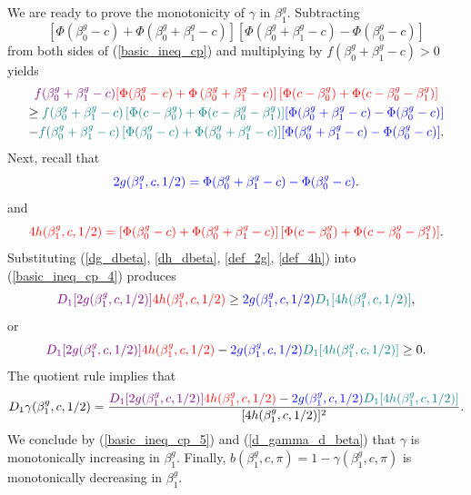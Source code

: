\documentclass[11pt]{article}
\begin{document}
\begin{appendices}
\begin{refsection}
We are ready to prove the monotonicity of $\gamma$ in $\beta^g_1$. Subtracting $$\left[\Phi(\beta_0^g - c) + \Phi(\beta^g_0 + \beta^g_1 - c) \right]\left[\Phi(\beta_0^g + \beta_1^g - c) - \Phi(\beta_0^g - c)\right]$$ from both sides of (\ref{basic_ineq_cp}) and multiplying by $f(\beta^g_0 + \beta^g_1 - c) > 0$ yields
\begin{multline}\label{basic_ineq_cp_4}
\textcolor{violet}{f(\beta^g_0 + \beta^g_1 - c)} \textcolor{red}{ \left[\Phi(\beta^g_0 - c) + \Phi\left(\beta^g_0 + \beta^g_1 - c \right) \right] \left[ \Phi(c - \beta^g_0) + \Phi(c - \beta^g_0 - \beta^g_1) \right]}  \\ \geq \textcolor{teal}{f(\beta^g_0 + \beta^g_1 - c) \left[\Phi(c - \beta^g_0) + \Phi(c - \beta_0^g - \beta_1^g)\right]}\textcolor{blue}{\left[\Phi(\beta_0^g + \beta_1^g - c) - \Phi(\beta_0^g - c)\right]} \\ -\textcolor{teal}{f(\beta^g_0 + \beta^g_1 - c)   \left[\Phi(\beta_0^g - c) + \Phi(\beta^g_0 + \beta^g_1 - c) \right]} \textcolor{blue}{\left[\Phi(\beta_0^g + \beta_1^g - c) - \Phi(\beta_0^g - c)\right]}.
\end{multline}
Next, recall that
\begin{equation}\label{def_2g}
\textcolor{blue}{2g(\beta^g_1,c,1/2) = \Phi(\beta^g_0 + \beta^g_1 - c) - \Phi(\beta^g_0 - c)}.
\end{equation}
and
\begin{equation}\label{def_4h}
\textcolor{red}{4h(\beta^g_1, c, 1/2) = \left[ \Phi(\beta^g_0 - c) + \Phi(\beta^g_0 + \beta^g_1 - c) \right] \left[\Phi(c - \beta^g_0) + \Phi( c - \beta^g_0 - \beta^g_1) \right]}.
\end{equation}
Substituting (\ref{dg_dbeta}, \ref{dh_dbeta}, \ref{def_2g}, \ref{def_4h}) into (\ref{basic_ineq_cp_4}) produces
\begin{equation*}
\textcolor{violet}{D_1[2g(\beta^g_1, c, 1/2)]}\textcolor{red}{4h(\beta^g_1, c, 1/2)} \geq \textcolor{blue}{2g(\beta^g_1, c, 1/2)}\textcolor{teal}{D_1[4h(\beta^g_1, c, 1/2)]},
\end{equation*}
or 
\begin{equation}\label{basic_ineq_cp_5}
\textcolor{violet}{D_1[2g(\beta^g_1, c, 1/2)]}\textcolor{red}{4h(\beta^g_1, c, 1/2)} - \textcolor{blue}{2g(\beta^g_1, c, 1/2)}\textcolor{teal}{D_1[4h(\beta^g_1, c, 1/2)]} \geq 0.
\end{equation}
The quotient rule implies that
\begin{equation}\label{d_gamma_d_beta}
D_1 \gamma(\beta^g_1, c, 1/2) = \frac{ \textcolor{violet}{D_1[2g(\beta^g_1, c, 1/2)]}\textcolor{red}{4h(\beta^g_1, c, 1/2)} - \textcolor{blue}{2g(\beta^g_1, c, 1/2)}\textcolor{teal}{D_1[4h(\beta^g_1, c, 1/2)]} }{[4h(\beta^g_1, c, 1/2)]^2}.
\end{equation}
We conclude by (\ref{basic_ineq_cp_5}) and (\ref{d_gamma_d_beta}) that $\gamma$ is monotonically increasing in $\beta^g_1$. Finally, $b(\beta^g_1, c, \pi) = 1 - \gamma(\beta^g_1, c, \pi)$ is monotonically decreasing in $\beta^g_1$.


\end{refsection}
\end{appendices}
\end{document}
